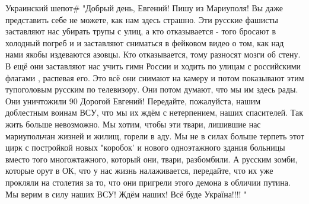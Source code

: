 
Украинский шепот# "Добрый день, Евгений! Пишу из Мариуполя! Вы даже представить себе не можете, как нам здесь страшно. Эти русские фашисты заставляют нас убирать трупы с улиц, а кто отказывается - того бросают в холодный погреб и и заставляют сниматься в фейковом видео о том, как над нами якобы издеваются азовцы. Кто отказывается, тому разносят мозги об стену. В ещё они заставляют нас учить гимн России и ходить по улицам с российскими флагами , распевая его. Это всё они снимают на камеру и потом показывают этим тупоголовым русским по телевизору. Они потом думают, что мы им здесь рады. Они уничтожили 90%
Дорогой Евгений! Передайте, пожалуйста, нашим доблестным воинам ВСУ, что мы их ждём с нетерпением, наших спасителей. Так жить больше невозможно. Мы хотим, чтобы эти твари, лишившие нас мариупольчан жизней и жилищ, горели в аду. Мы не в силах больше терпеть этот цирк с постройкой новых "коробок' и нового одноэтажного здания больницы вместо того многожтажного, который они, твари, разбомбили. А русским зомби, которые орут в ОК, что у нас жизнь налаживается, передайте, что их уже прокляли на столетия за то, что они пригрели этого демона в обличии путина. Мы верим в силу наших ВСУ! Ждём наших! Всё буде Україна!!!! "


